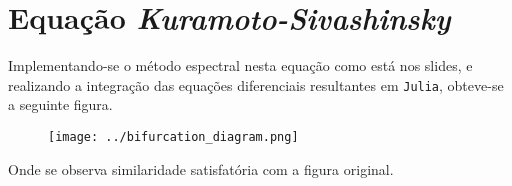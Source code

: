\documentclass{article}[twocolumn]
\begin{document}
	\section{Equa\c{c}\~ao \textit{Kuramoto-Sivashinsky}}
	Implementando-se o m\'etodo espectral nesta equa\c{c}\~ao como est\'a nos slides, e realizando
	a integra\c{c}\~ao das equa\c{c}\~oes diferenciais resultantes em \texttt{Julia}, obteve-se a seguinte
	figura.
	\begin{figure}[H]
		\centering
		\texttt{[image: ../bifurcation\_diagram.png]}
	\end{figure}
	Onde se observa similaridade satisfat\'oria com a figura original.
\end{document}
